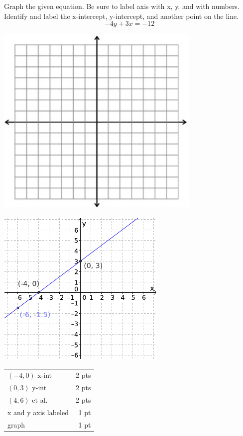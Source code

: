 {
	Graph the given equation. Be sure to label axis with x, y, and with numbers. Identify and label the x-intercept, y-intercept, and another point on the line.
	$$-4y+3x=-12$$
	\begin{onlyproblem}\begin{center}\includegraphics{fig-graphpaper.png}\end{center}\end{onlyproblem}
	\begin{onlysolution}\begin{center}\includegraphics{fig095-09-c-answer}\end{center}\end{onlysolution}
}
{
	\begin{tabular}{l r}
	$(-4,0)$ x-int & 2 pts\\
	$(0,3)$ y-int & 2 pts\\
	$(4,6)$ et al. & 2 pts\\
	x and y axis labeled & 1 pt\\
	graph & 1 pt\\
	\end{tabular}
}

